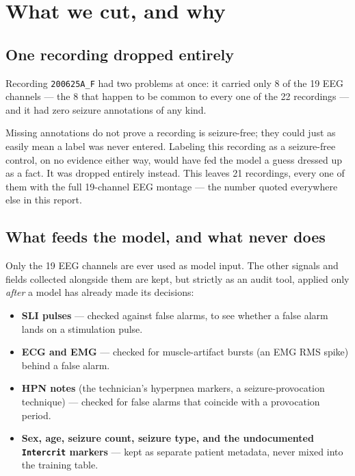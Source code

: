 \section{What we cut, and why}

\subsection{One recording dropped entirely}

Recording \texttt{200625A\_F} had two problems at once: it carried only 8 of the 19 EEG
channels --- the 8 that happen to be common to every one of the 22 recordings --- and it had
zero seizure annotations of any kind.

Missing annotations do not prove a recording is seizure-free; they could just as easily mean a
label was never entered. Labeling this recording as a seizure-free control, on no evidence
either way, would have fed the model a guess dressed up as a fact. It was dropped entirely
instead. This leaves 21 recordings, every one of them with the full 19-channel EEG montage ---
the number quoted everywhere else in this report.

\subsection{What feeds the model, and what never does}

Only the 19 EEG channels are ever used as model input. The other signals and fields collected
alongside them are kept, but strictly as an audit tool, applied only \emph{after} a model has
already made its decisions:

\begin{itemize}[leftmargin=1.4em]
  \item \textbf{SLI pulses} --- checked against false alarms, to see whether a false alarm lands
    on a stimulation pulse.
  \item \textbf{ECG and EMG} --- checked for muscle-artifact bursts (an EMG RMS spike) behind a
    false alarm.
  \item \textbf{HPN notes} (the technician's hyperpnea markers, a seizure-provocation technique)
    --- checked for false alarms that coincide with a provocation period.
  \item \textbf{Sex, age, seizure count, seizure type, and the undocumented
    \texttt{Intercrit} markers} --- kept as separate patient metadata, never mixed into the
    training table.
\end{itemize}

